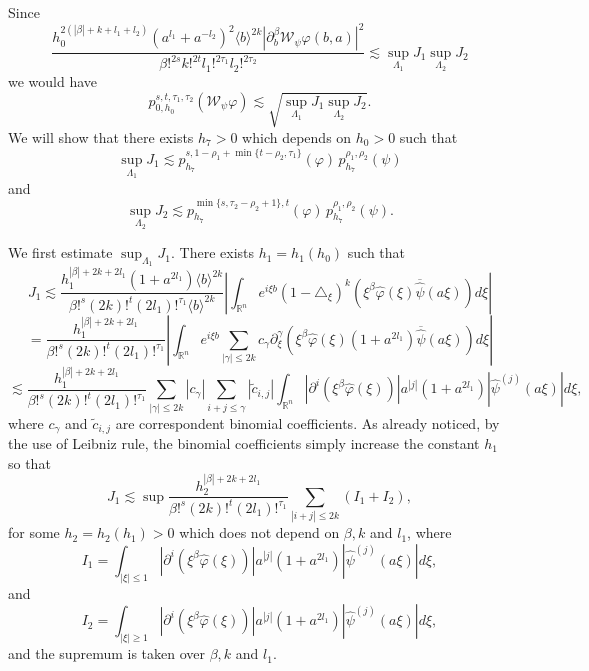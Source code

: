 \documentclass[reqno,12pt]{amsart}
\theoremstyle{plain}
\theoremstyle{definition}
\theoremstyle{remark}
\begin{document}
\par

Since
$$
\frac{h_0 ^{2(|\beta| +k+ l_1 + l_2)} (a^{l_1} + a^{-l_2})^{2}\langle b
\rangle^{2k} | \partial_b ^{\beta} \mathcal{W}_\psi \varphi (b,a) |^2}{ \beta!^{2s}
k!^{2t} l_1 !^{2\tau_1}  l_2 !^{2\tau_2}} \lesssim \sup_{\Lambda_1}
J_1  \sup_{\Lambda_2} J_2
$$
we would have
$$
p^{s,t, \tau_1, \tau_2} _{0,h_0} (\mathcal{W}_\psi \varphi) \lesssim
\sqrt{\sup_{\Lambda_1} J_1 \sup_{\Lambda_2} J_2}.
$$
We will show that there exists $h_7 >0$ which depends on $h_0>0$
such that
$$
\sup_{\Lambda_1} J_1 \lesssim p_{h_7}^{s, 1 - \rho_1 + \min\{t  - \rho_2,
\tau_1 \}} (\varphi) \, p^{\rho_1, \rho_2}_{h_7}
(\psi)
$$
and
$$
\sup_{\Lambda_2} J_2 \lesssim p_{h_7}^{\min\{s, \tau_2 - \rho_2 +1\},t}
(\varphi) \, p^{\rho_1, \rho_2} _{h_7} (\psi).
$$

\par

We first estimate $\sup_{\Lambda_1} J_1$. There exists $ h_1 = h_1
(h_0) $  such that
$$
J_1 \lesssim \frac{h_1 ^{|\beta| +2k+ 2l_1} (1 + a^{2l_1}) \langle b
\rangle^{2k}}{ \beta!^s (2k)!^{t} (2l_1) !^{\tau_1} \langle b
\rangle^{2k}} \left| \int_{\mathbb{R}^{n}} e^{i\xi b} (1-\triangle_\xi)^k (\xi^{\beta}
\hat{\varphi} (\xi) \overline{\hat{\psi}} (a\xi)) d\xi \right|
$$
$$
= \frac{h_1 ^{|\beta| +2k+ 2l_1} }{ \beta!^s (2k)!^{t} (2l_1)
!^{\tau_1}} \left| \int_{\mathbb{R}^{n}} e^{i\xi b} \sum_{|\gamma| \leq 2k} c_\gamma
\partial ^\gamma _\xi (\xi^{\beta} \hat{\varphi} (\xi) (1+ a^{2l_1})
\overline{\hat{\psi}} (a\xi)) d\xi \right|
$$
$$
\lesssim \frac{h_1 ^{|\beta| +2k+ 2l_1} }{ \beta!^s (2k)!^{t} (2l_1)
!^{\tau_1}}
 \sum_{|\gamma| \leq 2k} |c_\gamma | \sum_{i+j \leq \gamma} |\tilde c_{i,j}|
\int_{\mathbb{R}^{n}}   |\partial ^i (\xi^{\beta} \hat{\varphi} (\xi))|   a^{|j|}
(1+a^{2l_1})|\hat{\psi} ^{(j)} (a\xi)| d\xi,
$$
where $ c_\gamma $ and $ \tilde c_{i,j} $ are correspondent binomial
coefficients. As already noticed, by the use of Leibniz rule, the
binomial coefficients simply increase the constant $h_1$ so that
$$
J_1 \lesssim \sup \frac{h_2 ^{|\beta| +2k+ 2l_1} }{ \beta!^s
(2k)!^{t} (2l_1) !^{\tau_1}} \sum_{|i+j|\leq 2k}(I_1 + I_2),
$$
for some  $ h_2 = h_2 (h_1) >0$ which does not depend on $\beta, k$
and $l_1$, where
$$
I_1 = \int_{|\xi| \leq 1}    |\partial ^i (\xi^{\beta} \hat{\varphi}
(\xi))|   a^{|j|}(1+a^{ 2l_1})  |\hat{\psi} ^{(j)} (a\xi)| d\xi,
$$
and
$$
I_2 = \int_{|\xi| \geq 1}   |\partial ^i (\xi^{\beta} \hat{\varphi}
(\xi))|   a^{|j|}(1+a^{ 2l_1})  |\hat{\psi} ^{(j)} (a\xi)| d\xi,
$$
and the supremum is taken over $\beta, k$ and $l_1$.
\par
\end{document}
